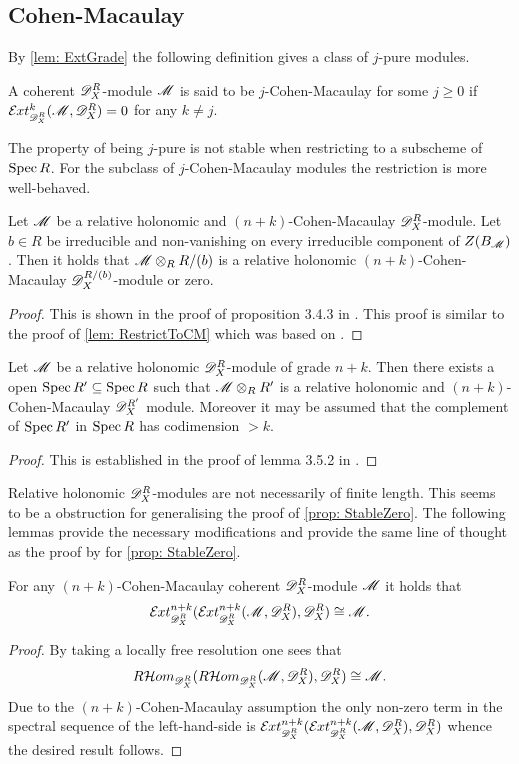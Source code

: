 \subsection{Cohen-Macaulay}
By \cref{lem: ExtGrade} the following definition gives a class of $j$-pure modules.
\begin{definition}
  A coherent $\mathscr{D}_X^R$-module $\mathscr{M}$ is said to be $j$-Cohen-Macaulay for some $j\geq 0$ if $\Ex{\D_X^R}{k}(\M,\D_X^R) = 0$ for any $k\neq j$.
\end{definition}
The property of being $j$-pure is not stable when restricting to a subscheme of $\operatorname{Spec} R$.
For the subclass of $j$-Cohen-Macaulay modules the restriction is more well-behaved.
\begin{lemma}\label{lem: CMLemmaBudur}
  Let $\mathscr{M}$ be a relative holonomic and $(n+k)$-Cohen-Macaulay $\mathscr{D}_X^R$-module. Let $b\in R$ be irreducible and non-vanishing on every irreducible component of $Z(B_{\mathscr{M}})$. Then it holds that $\mathscr{M}\otimes_R R/(b)$ is a relative holonomic $(n+k)$-Cohen-Macaulay $\mathscr{D}_X^{R/(b)}$-module or zero.
\end{lemma}
\begin{proof}
  This is shown in the proof of proposition 3.4.3 in \cite{budur2019zero}. This proof is similar to the proof of \cref{lem: RestrictToCM} which was based on \cite{budur2019zero}.
\end{proof}
\begin{lemma}\label{lem: GradeToCMOverOpen}
  Let $\mathscr{M}$ be a relative holonomic $\mathscr{D}_X^R$-module of grade $n+k$. Then there exists a open $\operatorname{Spec} R' \subseteq \operatorname{Spec} R$ such that $\mathscr{M}\otimes_R R'$ is a relative holonomic and $(n+k)$-Cohen-Macaulay $\mathscr{D}_X^{R'}$ module. Moreover it may be assumed that the complement of $\operatorname{Spec} R'$ in $\operatorname{Spec} R$ has codimension $>k$.
\end{lemma}
\begin{proof}
  This is established in the proof of lemma 3.5.2 in \cite{budur2019zero}.
\end{proof}
Relative holonomic $\mathscr{D}_X^R$-modules are not necessarily of finite length.
This seems to be a obstruction for generalising the proof of \cref{prop: StableZero}.
The following lemmas provide the necessary modifications and provide the same line of thought as the proof by \cite{kashiwara1976b} for \cref{prop: StableZero}.
\begin{lemma}
  For any $(n+k)$-Cohen-Macaulay coherent $\mathscr{D}_X^R$-module $\mathscr{M}$ it holds that  $$\Ex{\D_X^R}{n+k}(\Ex{\D_X^R}{n+k}(\M,\D_X^R),\D_X^R) \cong \M.$$
\end{lemma}
\begin{proof}
  By taking a locally free resolution one sees that
  $$R\mathcal{H}om_{\mathscr{D}_X^R}(R\mathcal{H}om_{\mathscr{D}_X^R}(\mathscr{M}, \mathscr{D}_X^R),\mathscr{D}_X^R) \cong \mathscr{M}.$$
  Due to the $(n+k)$-Cohen-Macaulay assumption the only non-zero term in the spectral sequence of the left-hand-side is $\Ex{\D_X^R}{n+k}(\Ex{\D_X^R}{n+k}(\M,\D_X^R),\D_X^R)$ whence the desired result follows.
\end{proof}

